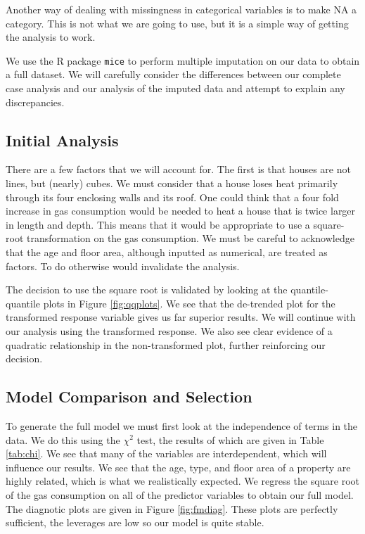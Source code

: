 \documentclass[9pt]{extarticle}
\begin{document}
Another way of dealing with missingness in categorical variables is to make NA a category. This is not what we are going to use, but it is a simple way of getting the analysis to work.

We use the R package \texttt{mice} to perform multiple imputation on our data to obtain a full dataset. We will carefully consider the differences between our complete case analysis and our analysis of the imputed data and attempt to explain any discrepancies. 

\subsection{Initial Analysis}

There are a few factors that we will account for. The first is that houses are not lines, but (nearly) cubes. We must consider that a house loses heat primarily through its four enclosing walls and its roof. One could think that a four fold increase in gas consumption would be needed to heat a house that is twice larger in length and depth. This means that it would be appropriate to use a square-root transformation on the gas consumption. We must be careful to acknowledge that the age and floor area, although inputted as numerical, are treated as factors. To do otherwise would invalidate the analysis.

The decision to use the square root is validated by looking at the quantile-quantile plots in Figure \ref{fig:qqplots}. We see that the de-trended plot for the transformed response variable gives us far superior results. We will continue with our analysis using the transformed response. We also see clear evidence of a quadratic relationship in the non-transformed plot, further reinforcing our decision. 

\subsection{Model Comparison and Selection}
To generate the full model we must first look at the independence of terms in the data. We do this using the $\chi^2$ test, the results of which are given in Table \ref{tab:chi}. We see that many of the variables are interdependent, which will influence our results. We see that the age, type, and floor area of a property are highly related, which is what we realistically expected. We regress the square root of the gas consumption on all of the predictor variables to obtain our full model. The diagnotic plots are given in Figure \ref{fig:fmdiag}. These plots are perfectly sufficient, the leverages are low so our model is quite stable. 
\end{document}
